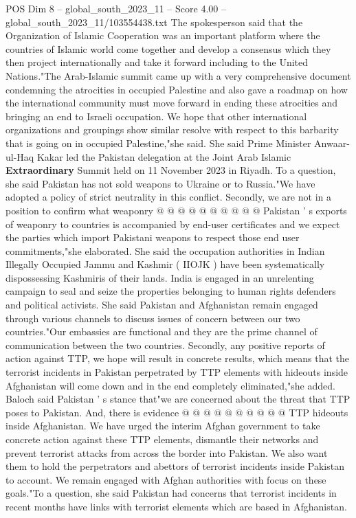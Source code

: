 \begin{textsample}{POS Dim 8 – global\_south\_2023\_11 – Score 4.00 – global\_south\_2023\_11/103554438.txt}
The spokesperson said that the Organization of Islamic Cooperation was an important platform where the countries of Islamic world come together and develop a consensus which they then project internationally and take it forward including to the United Nations."The Arab-Islamic summit came up with a very comprehensive document condemning the atrocities in occupied Palestine and also gave a roadmap on how the international community must move forward in ending these atrocities and bringing an end to Israeli occupation.
We hope that other international organizations and groupings show similar resolve with respect to this barbarity that is going on in occupied Palestine,"she said.
She said Prime Minister Anwaar- ul-Haq Kakar led the Pakistan delegation at the Joint Arab Islamic \textbf{Extraordinary} Summit held on 11 November 2023 in Riyadh.
To a question, she said Pakistan has not sold weapons to Ukraine or to Russia."We have adopted a policy of strict neutrality in this conflict.
Secondly, we are not in a position to confirm what weaponry @ @ @ @ @ @ @ @ @ @ Pakistan ' s exports of weaponry to countries is accompanied by end-user certificates and we expect the parties which import Pakistani weapons to respect those end user commitments,"she elaborated.
She said the occupation authorities in Indian Illegally Occupied Jammu and Kashmir ( IIOJK ) have been systematically dispossessing Kashmiris of their lands.
India is engaged in an unrelenting campaign to seal and seize the properties belonging to human rights defenders and political activists.
She said Pakistan and Afghanistan remain engaged through various channels to discuss issues of concern between our two countries."Our embassies are functional and they are the prime channel of communication between the two countries.
Secondly, any positive reports of action against TTP, we hope will result in concrete results, which means that the terrorist incidents in Pakistan perpetrated by TTP elements with hideouts inside Afghanistan will come down and in the end completely eliminated,"she added.
Baloch said Pakistan ' s stance that"we are concerned about the threat that TTP poses to Pakistan.
And, there is evidence @ @ @ @ @ @ @ @ @ @ TTP hideouts inside Afghanistan.
We have urged the interim Afghan government to take concrete action against these TTP elements, dismantle their networks and prevent terrorist attacks from across the border into Pakistan.
We also want them to hold the perpetrators and abettors of terrorist incidents inside Pakistan to account.
We remain engaged with Afghan authorities with focus on these goals."To a question, she said Pakistan had concerns that terrorist incidents in recent months have links with terrorist elements which are based in Afghanistan.

\end{textsample}
